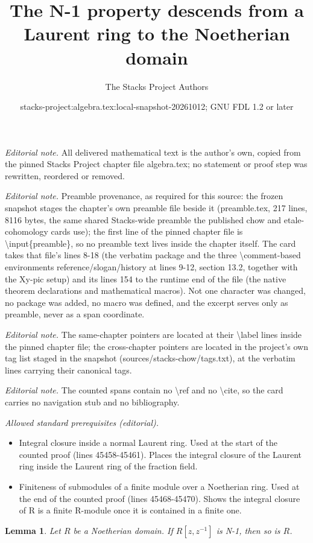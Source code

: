 \documentclass[10pt,a4paper]{amsart}
\title{The N-1 property descends from a Laurent ring to the Noetherian domain}
\author{The Stacks Project Authors}
\date{stacks-project:algebra.tex:local-snapshot-20261012; GNU FDL 1.2 or later}
\theoremstyle{plain}
\newtheorem{lemma}[subsection]{Lemma}
\theoremstyle{definition}
\theoremstyle{remark}
\numberwithin{equation}{subsection}
\begin{document}
\maketitle
\noindent\textit{Editorial note.} All delivered mathematical text is the author's own, copied from the pinned Stacks Project chapter file algebra.tex; no statement or proof step was rewritten, reordered or removed.\par\medskip
\noindent\textit{Editorial note.} Preamble provenance, as required for this source: the frozen snapshot stages the chapter's own preamble file beside it (preamble.tex, 217 lines, 8116 bytes, the same shared Stacks-wide preamble the published chow and etale-cohomology cards use); the first line of the pinned chapter file is \textbackslash{}input\{preamble\}, so no preamble text lives inside the chapter itself. The card takes that file's lines 8-18 (the verbatim package and the three \textbackslash{}comment-based environments reference/slogan/history at lines 9-12, section 13.2, together with the Xy-pic setup) and its lines 154 to the runtime end of the file (the native theorem declarations and mathematical macros). Not one character was changed, no package was added, no macro was defined, and the excerpt serves only as preamble, never as a span coordinate.\par\medskip
\noindent\textit{Editorial note.} The same-chapter pointers are located at their \textbackslash{}label lines inside the pinned chapter file; the cross-chapter pointers are located in the project's own tag list staged in the snapshot (sources/stacks-chow/tags.txt), at the verbatim lines carrying their canonical tags.\par\medskip
\noindent\textit{Editorial note.} The counted spans contain no \textbackslash{}ref and no \textbackslash{}cite, so the card carries no navigation stub and no bibliography.\par\medskip
\noindent\textit{Allowed standard prerequisites (editorial).}\begin{itemize}
\item Integral closure inside a normal Laurent ring. Used at the start of the counted proof (lines 45458-45461). Places the integral closure of the Laurent ring inside the Laurent ring of the fraction field.
\item Finiteness of submodules of a finite module over a Noetherian ring. Used at the end of the counted proof (lines 45468-45470). Shows the integral closure of R is a finite R-module once it is contained in a finite one.
\end{itemize}\medskip
\begin{lemma}
\label{lemma-Laurent-ring-N-1}
Let $R$ be a Noetherian domain.
If $R[z, z^{-1}]$ is N-1, then so is $R$.
\end{lemma}
\end{document}
